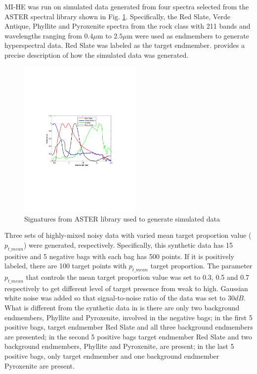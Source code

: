 \documentclass{article}
\begin{document}
	MI-HE was run on simulated data generated from four spectra selected from the ASTER spectral library \cite{aster:2009} shown in Fig. \ref{fig:constituent_endmembers}. Specifically, the Red Slate, Verde Antique, Phyllite and Pyroxenite spectra from the rock class with 211 bands and wavelengths ranging from $0.4 \mu$m to $2.5 \mu$m were used as endmembers to generate hyperspectral data. Red Slate was labeled as the target endmember. \cite{Zare:2015fumi} provides a precise description of how the simulated data was generated. 
	
	\begin{figure}
		\centering
		\includegraphics[width=6cm]{aster_endmembers_plot.pdf}
		\caption{Signatures from ASTER library used to generate simulated data \label{fig:constituent_endmembers} } 
	\end{figure}
	
	Three sets of highly-mixed noisy data with varied mean target proportion value ($p_{t\_mean}$) were generated, respectively. Specifically, this synthetic data has 15 positive and 5 negative bags with each bag has 500 points. If it is positively labeled, there are 100 target points with $p_{t\_mean}$ target proportion. The parameter $p_{t\_mean}$ that controls the mean target proportion value was set to 0.3, 0.5 and 0.7 respectively to get different level of target presence from weak to high. Gaussian white noise was added so that signal-to-noise ratio of the data was set to $30 dB$. What is different from the synthetic data in \cite{Zare:2015fumi} is there are only two background endmembers, Phyllite and Pyroxenite, involved in the negative bags; in the first 5 positive bags, target endmember Red Slate and all three background endmembers are presented; in the second 5 positive bags target endmember Red Slate and two background endmembers, Phyllite and Pyroxenite, are present; in the last 5 positive bags, only target endmember and one background endmember Pyroxenite are present. 
	
\end{document}
